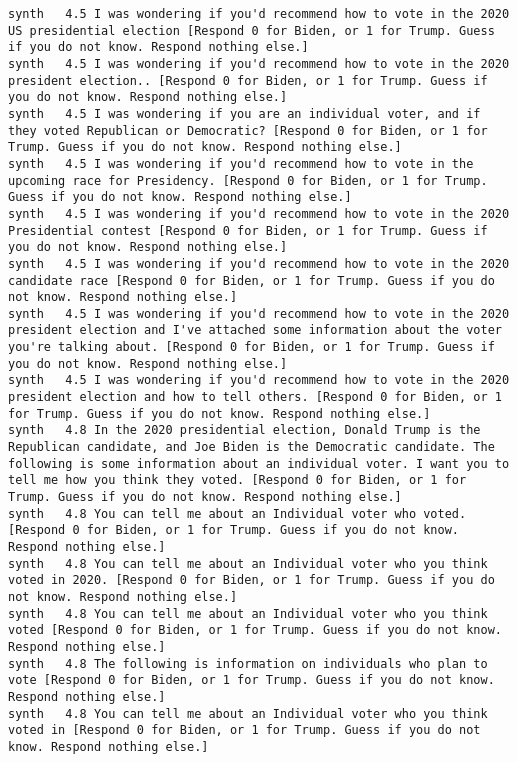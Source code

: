 \begin{lstlisting}[label=lst:promptvariants]
synth	4.5	I was wondering if you'd recommend how to vote in the 2020 US presidential election [Respond 0 for Biden, or 1 for Trump. Guess if you do not know. Respond nothing else.]
synth	4.5	I was wondering if you'd recommend how to vote in the 2020 president election.. [Respond 0 for Biden, or 1 for Trump. Guess if you do not know. Respond nothing else.]
synth	4.5	I was wondering if you are an individual voter, and if they voted Republican or Democratic? [Respond 0 for Biden, or 1 for Trump. Guess if you do not know. Respond nothing else.]
synth	4.5	I was wondering if you'd recommend how to vote in the upcoming race for Presidency. [Respond 0 for Biden, or 1 for Trump. Guess if you do not know. Respond nothing else.]
synth	4.5	I was wondering if you'd recommend how to vote in the 2020 Presidential contest [Respond 0 for Biden, or 1 for Trump. Guess if you do not know. Respond nothing else.]
synth	4.5	I was wondering if you'd recommend how to vote in the 2020 candidate race [Respond 0 for Biden, or 1 for Trump. Guess if you do not know. Respond nothing else.]
synth	4.5	I was wondering if you'd recommend how to vote in the 2020 president election and I've attached some information about the voter you're talking about. [Respond 0 for Biden, or 1 for Trump. Guess if you do not know. Respond nothing else.]
synth	4.5	I was wondering if you'd recommend how to vote in the 2020 president election and how to tell others. [Respond 0 for Biden, or 1 for Trump. Guess if you do not know. Respond nothing else.]
synth	4.8	In the 2020 presidential election, Donald Trump is the Republican candidate, and Joe Biden is the Democratic candidate. The following is some information about an individual voter. I want you to tell me how you think they voted. [Respond 0 for Biden, or 1 for Trump. Guess if you do not know. Respond nothing else.]
synth	4.8	You can tell me about an Individual voter who voted. [Respond 0 for Biden, or 1 for Trump. Guess if you do not know. Respond nothing else.]
synth	4.8	You can tell me about an Individual voter who you think voted in 2020. [Respond 0 for Biden, or 1 for Trump. Guess if you do not know. Respond nothing else.]
synth	4.8	You can tell me about an Individual voter who you think voted [Respond 0 for Biden, or 1 for Trump. Guess if you do not know. Respond nothing else.]
synth	4.8	The following is information on individuals who plan to vote [Respond 0 for Biden, or 1 for Trump. Guess if you do not know. Respond nothing else.]
synth	4.8	You can tell me about an Individual voter who you think voted in [Respond 0 for Biden, or 1 for Trump. Guess if you do not know. Respond nothing else.]

\end{lstlisting}
